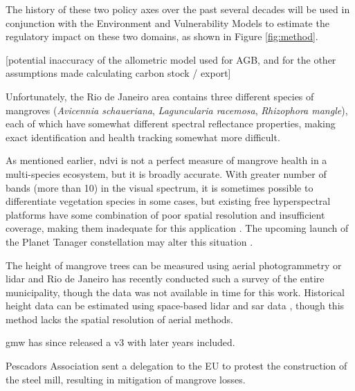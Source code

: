 The history of these two policy axes over the past several decades will be used in conjunction with the Environment and Vulnerability Models to estimate the regulatory impact on these two domains, as shown in Figure \ref{fig:method}.

[potential inaccuracy of the allometric model used for AGB, and for the other assumptions made calculating carbon stock / export]


Unfortunately, the Rio de Janeiro area contains three different species of mangroves (\textit{Avicennia schaueriana}, \textit{Laguncularia racemosa}, \textit{Rhizophora mangle}), each of which have somewhat different spectral reflectance properties, making exact identification and health tracking somewhat more difficult.

As mentioned earlier, \ac{ndvi} is not a perfect measure of mangrove health in a multi-species ecosystem, but it is broadly accurate. With greater number of bands (more than 10) in the visual spectrum, it is sometimes possible to differentiate vegetation species in some cases, but existing free hyperspectral platforms have some combination of poor spatial resolution and insufficient coverage, making them inadequate for this application \cite{mousivandGlobalSensitivityAnalysis2014}. The upcoming launch of the Planet Tanager constellation may alter this situation \cite{planetlabspbcPlanetAnnouncesNew2022}.

The height of mangrove trees can be measured using aerial photogrammetry or \ac{lidar} \cite{olagokeIndividualMangroveTree2015} and Rio de Janeiro has recently conducted such a survey of the entire municipality, though the data was not available in time for this work. Historical height data can be estimated using space-based \ac{lidar} and \ac{sar} data \cite{lagomasinoComparisonMangroveCanopy2016}, though this method lacks the spatial resolution of aerial methods.

\ac{gmw} has since released a v3 with later years included.

Pescadors Association sent a delegation to the EU to protest the construction of the steel mill, resulting in mitigation of mangrove losses. 

\section{}






